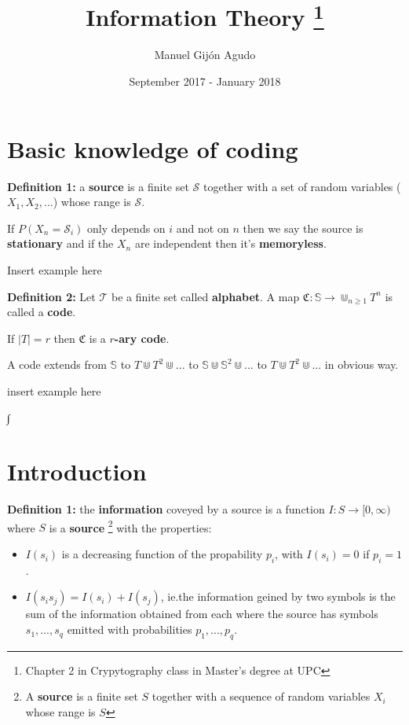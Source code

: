 \documentclass{article}
\title{Information Theory \thanks{Chapter 2 in Crypytography class in Master's degree at UPC}}
\author{Manuel Gijón Agudo }
\date{September 2017 - January 2018}
\begin{document}
	\begin{titlepage}
		\maketitle{} 
	\end{titlepage}
	
	\newpage
	\tableofcontents
	\newpage
					
					
		\section{Basic knowledge of coding}

\noindent\textbf{Definition 	1:}  a \textbf{source} is a finite set $\mathcal{S}$ together with a set of random variables ($X_1, X_2, ...$) whose range is $\mathcal{S}$.

If $P(X_n = \mathcal{S}_i)$ only depends on $i$ and not on $n$ then we say the source is \textbf{stationary} and if the $X_n$ are independent then it's \textbf{memoryless}.

Insert example here

\noindent\textbf{Definition 	2:} Let $\mathcal{T}$ be a finite set called \textbf{alphabet}. A map $\mathfrak{C}: \mathbb{S} \longrightarrow \Cup_{n \geq 1} T^{n}$ is called a \textbf{code}.

If $|T| = r$ then $\mathfrak{C}$ is a \textbf{$r$-ary code}. 

A code extends from $\mathbb{S}$ to $T \Cup T^2 \Cup ...$ to $\mathbb{S} \Cup \mathbb{S}^2 \Cup ...$  to $T \Cup T^2 \Cup ...$ in obvious way.

insert example here


∫
		\section{Introduction}

\noindent\textbf{Definition 	1:} the \textbf{information} coveyed by a source is a function $I:S  \rightarrow [ 0, \infty ) $ where $S$ is a \textbf{source} \footnote{A \textbf{source} is a finite set $S$ together with a sequence of random variables $X_i$ whose range is $S$} with the properties:
		
		\begin{itemize}
			\item $I(s_i)$ is a decreasing function of the propability $p_i$, with $I(s_i) = 0$ if $p_i = 1$.
			\item $I(s_i s_j) = I(s_i) + I(s_j)$, ie.the information geined by two symbols is the sum of the information obtained from each where the source has symbols $s_1, ..., s_q$ emitted with probabilities $p_1, ..., p_q$.
		\end{itemize}
		
\end{document}
